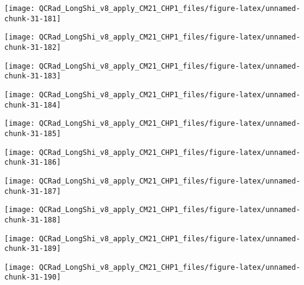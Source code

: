 \documentclass[
  10pt,
  a4paper,oneside]{article}
\begin{document}
\begin{center}\texttt{[image: QCRad\_LongShi\_v8\_apply\_CM21\_CHP1\_files/figure-latex/unnamed-chunk-31-181]} \end{center}

\begin{center}\texttt{[image: QCRad\_LongShi\_v8\_apply\_CM21\_CHP1\_files/figure-latex/unnamed-chunk-31-182]} \end{center}

\begin{center}\texttt{[image: QCRad\_LongShi\_v8\_apply\_CM21\_CHP1\_files/figure-latex/unnamed-chunk-31-183]} \end{center}

\begin{center}\texttt{[image: QCRad\_LongShi\_v8\_apply\_CM21\_CHP1\_files/figure-latex/unnamed-chunk-31-184]} \end{center}

\begin{center}\texttt{[image: QCRad\_LongShi\_v8\_apply\_CM21\_CHP1\_files/figure-latex/unnamed-chunk-31-185]} \end{center}

\begin{center}\texttt{[image: QCRad\_LongShi\_v8\_apply\_CM21\_CHP1\_files/figure-latex/unnamed-chunk-31-186]} \end{center}

\begin{center}\texttt{[image: QCRad\_LongShi\_v8\_apply\_CM21\_CHP1\_files/figure-latex/unnamed-chunk-31-187]} \end{center}

\begin{center}\texttt{[image: QCRad\_LongShi\_v8\_apply\_CM21\_CHP1\_files/figure-latex/unnamed-chunk-31-188]} \end{center}

\begin{center}\texttt{[image: QCRad\_LongShi\_v8\_apply\_CM21\_CHP1\_files/figure-latex/unnamed-chunk-31-189]} \end{center}

\begin{center}\texttt{[image: QCRad\_LongShi\_v8\_apply\_CM21\_CHP1\_files/figure-latex/unnamed-chunk-31-190]} \end{center}
\end{document}
